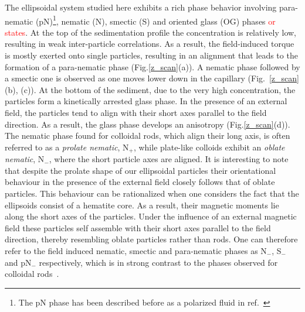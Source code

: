 \documentclass[aps,prl,preprint,superscriptaddress]{revtex4-1} %
\begin{document}
The ellipsoidal system studied here exhibits a rich phase behavior involving para-nematic (pN)\footnote{The pN phase has been described before as a polarized fluid in ref.~\cite{martchenko2016anisotropic}}, nematic (N), smectic (S) and oriented glass (OG) phases \textcolor{red}{or states}. At the top of the sedimentation profile the concentration is relatively low, resulting in weak inter-particle correlations. As a result, the field-induced torque is mostly exerted onto single particles, resulting in an alignment that leads to the formation of a para-nematic phase (Fig.\ref{z_scan}(a)). A nematic phase followed by a smectic one is observed as one moves lower down in the capillary (Fig.~\ref{z_scan}(b), (c)). At the bottom of the sediment, due to the very high concentration, the particles form a kinetically arrested glass phase. In the presence of an external field, the particles tend to align with their short axes parallel to the field direction. As a result, the glass phase develops an anisotropy (Fig.\ref{z_scan}(d)). The nematic phase found for colloidal rods, which align their long axis, is often referred to as a \emph{prolate nematic}, N$_+$, while plate-like colloids exhibit an \emph{oblate nematic}, N$_-$, where the short particle axes are aligned. It is interesting to note that despite the prolate shape of our ellipsoidal particles their orientational behaviour in the presence of the external field closely follows that of oblate particles. This behaviour can be rationalized when one considers the fact that the ellipsoids consist of a hematite core. As a result, their magnetic moments lie along the short axes of the particles. Under the influence of an external magnetic field these particles self assemble with their short axes parallel to the field direction, thereby resembling oblate particles rather than rods. One can therefore refer to the field induced nematic, smectic and para-nematic phases as N$_-$, S$_-$ and pN$_-$ respectively, which is in strong contrast to the phases observed for colloidal rods~\cite{kuijk2011synthesis}. \par
\end{document}

